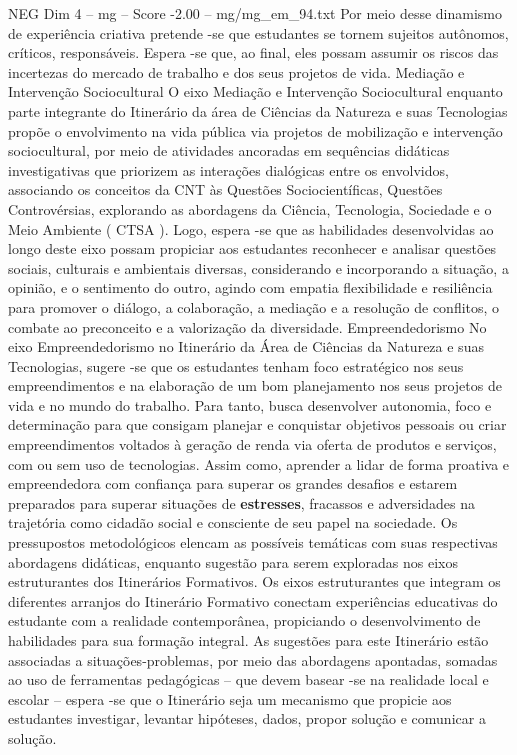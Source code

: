 \begin{textsample}{NEG Dim 4 – mg – Score -2.00 – mg/mg\_em\_94.txt}
Por meio desse dinamismo de experiência criativa pretende -se que estudantes se tornem sujeitos autônomos, críticos, responsáveis.
Espera -se que, ao final, eles possam assumir os riscos das incertezas do mercado de trabalho e dos seus projetos de vida.
Mediação e Intervenção Sociocultural O eixo Mediação e Intervenção Sociocultural enquanto parte integrante do Itinerário da área de Ciências da Natureza e suas Tecnologias propõe o envolvimento na vida pública via projetos de mobilização e intervenção sociocultural, por meio de atividades ancoradas em sequências didáticas investigativas que priorizem as interações dialógicas entre os envolvidos, associando os conceitos da CNT às Questões Sociocientíficas, Questões Controvérsias, explorando as abordagens da Ciência, Tecnologia, Sociedade e o Meio Ambiente ( CTSA ).
Logo, espera -se que as habilidades desenvolvidas ao longo deste eixo possam propiciar aos estudantes reconhecer e analisar questões sociais, culturais e ambientais diversas, considerando e incorporando a situação, a opinião, e o sentimento do outro, agindo com empatia flexibilidade e resiliência para promover o diálogo, a colaboração, a mediação e a resolução de conflitos, o combate ao preconceito e a valorização da diversidade.
Empreendedorismo No eixo Empreendedorismo no Itinerário da Área de Ciências da Natureza e suas Tecnologias, sugere -se que os estudantes tenham foco estratégico nos seus empreendimentos e na elaboração de um bom planejamento nos seus projetos de vida e no mundo do trabalho.
Para tanto, busca desenvolver autonomia, foco e determinação para que consigam planejar e conquistar objetivos pessoais ou criar empreendimentos voltados à geração de renda via oferta de produtos e serviços, com ou sem uso de tecnologias.
Assim como, aprender a lidar de forma proativa e empreendedora com confiança para superar os grandes desafios e estarem preparados para superar situações de \textbf{estresses}, fracassos e adversidades na trajetória como cidadão social e consciente de seu papel na sociedade.
Os pressupostos metodológicos elencam as possíveis temáticas com suas respectivas abordagens didáticas, enquanto sugestão para serem exploradas nos eixos estruturantes dos Itinerários Formativos.
Os eixos estruturantes que integram os diferentes arranjos do Itinerário Formativo conectam experiências educativas do estudante com a realidade contemporânea, propiciando o desenvolvimento de habilidades para sua formação integral.
As sugestões para este Itinerário estão associadas a situações-problemas, por meio das abordagens apontadas, somadas ao uso de ferramentas pedagógicas – que devem basear -se na realidade local e escolar – espera -se que o Itinerário seja um mecanismo que propicie aos estudantes investigar, levantar hipóteses, dados, propor solução e comunicar a solução.

\end{textsample}
